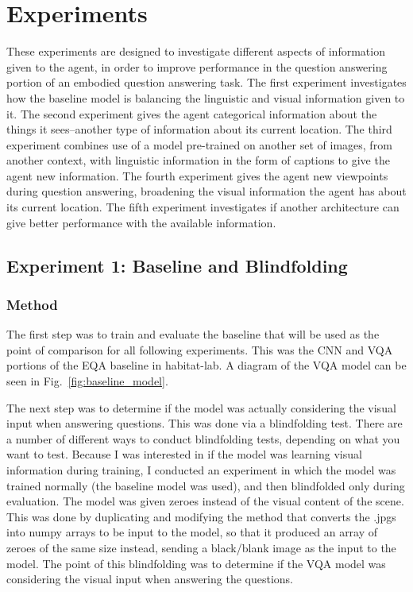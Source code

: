 \chapter{Experiments}
These experiments are designed to investigate different aspects of information given to the agent, in order to improve performance in the question answering portion of an embodied question answering task. The first experiment investigates how the baseline model is balancing the linguistic and visual information given to it. The second experiment gives the agent categorical information about the things it sees--another type of information about its current location. The third experiment combines use of a model pre-trained on another set of images, from another context, with linguistic information in the form of captions to give the agent new information. The fourth experiment gives the agent new viewpoints during question answering, broadening the visual information the agent has about its current location. The fifth experiment investigates if another architecture can give better performance with the available information. 

\section{Experiment 1: Baseline and Blindfolding}
\label{sec:exp_1}
\subsection{Method}
The first step was to train and evaluate the baseline that will be used as the point of comparison for all following experiments. This was the CNN and VQA portions of the EQA baseline in habitat-lab. A diagram of the VQA model can be seen in Fig.~\ref{fig:baseline_model}. 

The next step was to determine if the model was actually considering the visual input when answering questions. This was done via a blindfolding test. There are a number of different ways to conduct blindfolding tests, depending on what you want to test. Because I was interested in if the model was learning visual information during training, I conducted an experiment in which the model was trained normally (the baseline model was used), and then blindfolded only during evaluation. The model was given zeroes instead of the visual content of the scene. This was done by duplicating and modifying the method that converts the .jpgs into numpy arrays to be input to the model, so that it produced an array of zeroes of the same size instead, sending a black/blank image as the input to the model. The point of this blindfolding was to determine if the VQA model was considering the visual input when answering the questions. 

